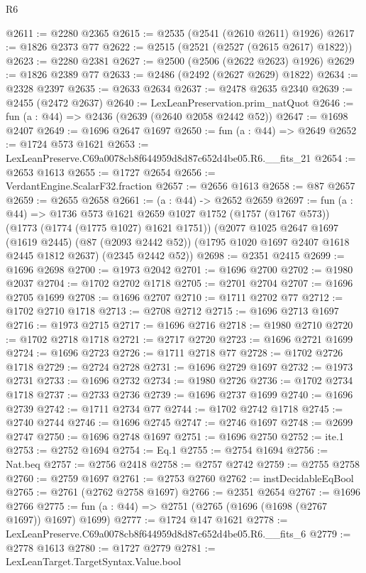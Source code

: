 \begin{lexlean}{R6}
\begin{coremodule}
@2611 := @2280 @2365
@2615 := @2535 (@2541 (@2610 @2611) @1926)
@2617 := @1826 @2373 @77
@2622 := @2515 (@2521 (@2527 (@2615 @2617) @1822))
@2623 := @2280 @2381
@2627 := @2500 (@2506 (@2622 @2623) @1926)
@2629 := @1826 @2389 @77
@2633 := @2486 (@2492 (@2627 @2629) @1822)
@2634 := @2328 @2397
@2635 := @2633 @2634
@2637 := @2478 @2635 @2340
@2639 := @2455 (@2472 @2637)
@2640 := LexLeanPreservation.prim_natQuot
@2646 := fun (a : @44) => @2436 (@2639 (@2640 @2058 @2442 @52))
@2647 := @1698 @2407
@2649 := @1696 @2647 @1697
@2650 := fun (a : @44) => @2649
@2652 := @1724 @573 @1621
@2653 := LexLeanPreserve.C69a0078cb8f644959d8d87c652d4be05.R6.__fits_21
@2654 := @2653 @1613
@2655 := @1727 @2654
@2656 := VerdantEngine.ScalarF32.fraction
@2657 := @2656 @1613
@2658 := @87 @2657
@2659 := @2655 @2658
@2661 := (a : @44) -> @2652 @2659
@2697 := fun (a : @44) =>
  @1736
    @573
    @1621
    @2659
    @1027
    @1752
    (@1757 (@1767 @573))
    (@1773 (@1774 (@1775 @1027) @1621 @1751))
    (@2077
      @1025
      @2647
      @1697
      (@1619 @2445)
      (@87 (@2093 @2442 @52))
      (@1795 @1020 @1697 @2407 @1618 @2445 @1812 @2637)
      (@2345 @2442 @52))
@2698 := @2351 @2415
@2699 := @1696 @2698
@2700 := @1973 @2042
@2701 := @1696 @2700
@2702 := @1980 @2037
@2704 := @1702 @2702 @1718
@2705 := @2701 @2704
@2707 := @1696 @2705 @1699
@2708 := @1696 @2707
@2710 := @1711 @2702 @77
@2712 := @1702 @2710 @1718
@2713 := @2708 @2712
@2715 := @1696 @2713 @1697
@2716 := @1973 @2715
@2717 := @1696 @2716
@2718 := @1980 @2710
@2720 := @1702 @2718 @1718
@2721 := @2717 @2720
@2723 := @1696 @2721 @1699
@2724 := @1696 @2723
@2726 := @1711 @2718 @77
@2728 := @1702 @2726 @1718
@2729 := @2724 @2728
@2731 := @1696 @2729 @1697
@2732 := @1973 @2731
@2733 := @1696 @2732
@2734 := @1980 @2726
@2736 := @1702 @2734 @1718
@2737 := @2733 @2736
@2739 := @1696 @2737 @1699
@2740 := @1696 @2739
@2742 := @1711 @2734 @77
@2744 := @1702 @2742 @1718
@2745 := @2740 @2744
@2746 := @1696 @2745
@2747 := @2746 @1697
@2748 := @2699 @2747
@2750 := @1696 @2748 @1697
@2751 := @1696 @2750
@2752 := ite.{1}
@2753 := @2752 @1694
@2754 := Eq.{1}
@2755 := @2754 @1694
@2756 := Nat.beq
@2757 := @2756 @2418
@2758 := @2757 @2742
@2759 := @2755 @2758
@2760 := @2759 @1697
@2761 := @2753 @2760
@2762 := instDecidableEqBool
@2765 := @2761 (@2762 @2758 @1697)
@2766 := @2351 @2654
@2767 := @1696 @2766
@2775 := fun (a : @44) => @2751 (@2765 (@1696 (@1698 (@2767 @1697)) @1697) @1699)
@2777 := @1724 @147 @1621
@2778 := LexLeanPreserve.C69a0078cb8f644959d8d87c652d4be05.R6.__fits_6
@2779 := @2778 @1613
@2780 := @1727 @2779
@2781 := LexLeanTarget.TargetSyntax.Value.bool

\end{coremodule}
\end{lexlean}
